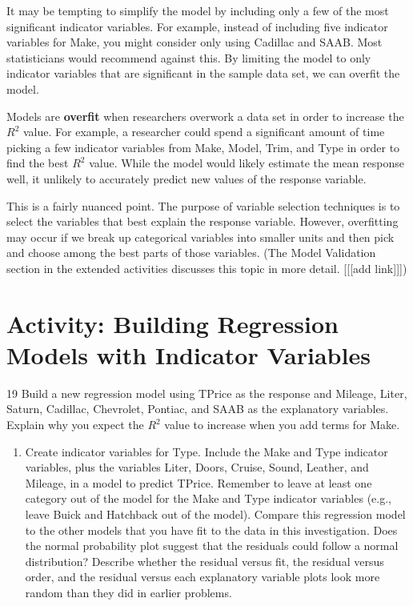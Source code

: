 \documentclass[
]{report}
\providecommand{\tightlist}{%
  \setlength{\itemsep}{0pt}\setlength{\parskip}{0pt}}
\begin{document}
It may be tempting to simplify the model by including only a few of the most significant indicator variables. For example, instead of including five indicator variables for Make, you might consider only using Cadillac and SAAB. Most statisticians would recommend against this. By limiting the model to only indicator
variables that are significant in the sample data set, we can overfit the model.

Models are \textbf{overfit} when researchers overwork a data set in order to increase the \(R^2\) value. For example, a researcher could spend a significant amount of time picking a few indicator variables from Make, Model, Trim, and Type in order to find the best \(R^2\) value. While the model would likely estimate the mean response well, it unlikely to accurately predict new values of the response variable.

This is a fairly nuanced point. The purpose of variable selection techniques is to select the variables that best explain the response variable. However, overfitting may occur if we break up categorical variables into smaller units and then pick and choose among the best parts of those variables. (The Model Validation section
in the extended activities discusses this topic in more detail. {[}{[}{[}add link{]}{]}{]})

\section*{Activity: Building Regression Models with Indicator Variables}\label{activity-building-regression-models-with-indicator-variables}

19 Build a new regression model using TPrice as the response and Mileage, Liter, Saturn, Cadillac, Chevrolet, Pontiac, and SAAB as the explanatory variables. Explain why you expect the \(R^2\) value to increase when you add terms for Make.

\begin{enumerate}
\def\labelenumi{\arabic{enumi}.}
\setcounter{enumi}{19}
\tightlist
\item
  Create indicator variables for Type. Include the Make and Type indicator variables, plus the variables Liter, Doors, Cruise, Sound, Leather, and Mileage, in a model to predict TPrice. Remember to leave at least one category out of the model for the Make and Type indicator variables (e.g., leave Buick and Hatchback out of the model). Compare this regression model to the other models that you have fit
  to the data in this investigation. Does the normal probability plot suggest that the residuals could follow a normal distribution? Describe whether the residual versus fit, the residual versus order, and the residual versus each explanatory variable plots look more random than they did in earlier problems.
\end{enumerate}
\end{document}
